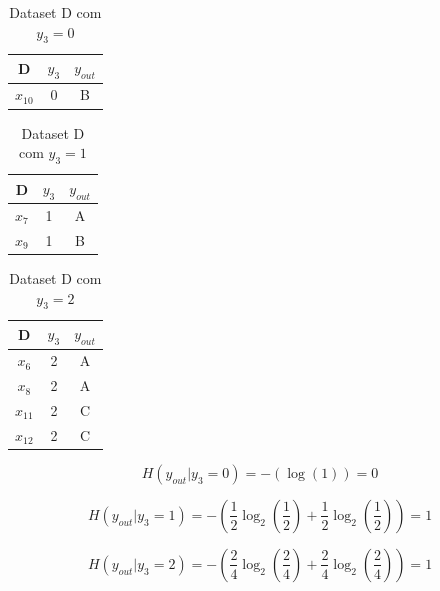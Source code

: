 \documentclass{article}
\begin{document}
\begin{multicols}{3}
\setlength{\columnseprule}{0pt}

\vspace*{\fill}
\begin{table}[H]
\centering
\begin{tabular}{|c|c|c|}
\hline
D     & $y_3$ & $y_{out}$ \\ \hline
$x_{10}$ & 0     & B         \\ \hline
\end{tabular}
\caption{Dataset D com $y_3 = 0$}
\label{tab:datasetDy3=0}
\end{table}

\vspace*{\fill}

\collumnbreak

\begin{table}[H]
\centering
\begin{tabular}{|c|c|c|}
\hline
D     & $y_3$ & $y_{out}$ \\ \hline
$x_7$ & 1     & A         \\ \hline
$x_9$ & 1     & B         \\ \hline
\end{tabular}
\caption{Dataset D com $y_3 = 1$}
\label{tab:datasetDy3=1}
\end{table}


\vspace*{\fill}
\collumnbreak

\begin{table}[H]
\centering
\begin{tabular}{|c|c|c|}
\hline
D     & $y_3$ & $y_{out}$ \\ \hline
$x_6$ & 2     & A         \\ \hline
$x_8$ & 2     & A         \\ \hline
$x_{11}$ & 2     & C         \\ \hline
$x_{12}$ & 2     & C         \\ \hline
\end{tabular}
\caption{Dataset D com $y_3 = 2$}
\label{tab:datasetDy3=2}
\end{table}
\end{multicols}

\[ H(y_{out}|y_3 = 0) = - \left( \log(1) \right) = 0 \]

\[ H(y_{out}|y_3 = 1) = - \left( \frac{1}{2} \log_2 \left( \frac{1}{2} \right) + \frac{1}{2} \log_2 \left( \frac{1}{2} \right) \right) = 1 \]

\[ H(y_{out}|y_3 = 2) = - \left( \frac{2}{4} \log_2 \left( \frac{2}{4} \right) + \frac{2}{4} \log_2 \left( \frac{2}{4} \right) \right) = 1 \]
\end{document}
